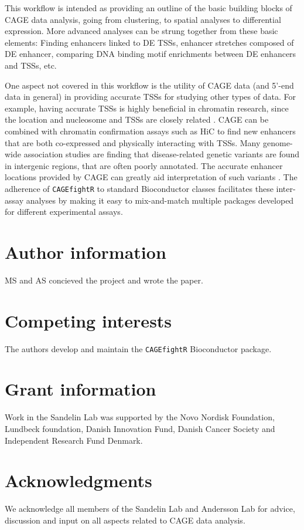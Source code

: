 \documentclass[9pt,a4paper,]{extarticle}
\begin{document}
This workflow is intended as providing an outline of the basic building blocks of CAGE data analysis, going from clustering, to spatial analyses to differential expression. More advanced analyses can be strung together from these basic elements: Finding enhancers linked to DE TSSs, enhancer stretches composed of DE enhancer, comparing DNA binding motif enrichments between DE enhancers and TSSs, etc.

One aspect not covered in this workflow is the utility of CAGE data (and 5'-end data in general) in providing accurate TSSs for studying other types of data. For example, having accurate TSSs is highly beneficial in chromatin research, since the location and nucleosome and TSSs are closely related \citep{Andersson2014b, Duttke2015, Thodberg2018a}. CAGE can be combined with chromatin confirmation assays such as HiC to find new enhancers that are both co-expressed and physically interacting with TSSs. Many genome-wide association studies are finding that disease-related genetic variants are found in intergenic regions, that are often poorly annotated. The accurate enhancer locations provided by CAGE can greatly aid interpretation of such variants \citep{Boyd2018}. The adherence of \texttt{CAGEfightR} to standard Bioconductor classes facilitates these inter-assay analyses by making it easy to mix-and-match multiple packages developed for different experimental assays.

\section{Author information}\label{author-information}

MS and AS concieved the project and wrote the paper.

\section{Competing interests}\label{competing-interests}

The authors develop and maintain the \texttt{CAGEfightR} Bioconductor package.

\section{Grant information}\label{grant-information}

Work in the Sandelin Lab was supported by the Novo Nordisk Foundation, Lundbeck foundation, Danish Innovation Fund, Danish Cancer Society and Independent Research Fund Denmark.

\section{Acknowledgments}\label{acknowledgments}

We acknowledge all members of the Sandelin Lab and Andersson Lab for advice, discussion and input on all aspects related to CAGE data analysis.

{\small}
\end{document}
